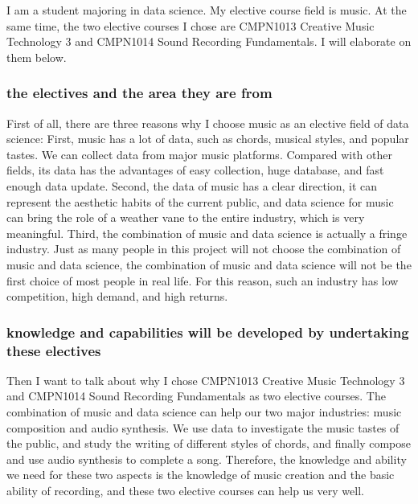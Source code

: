 \documentclass[../draft.tex]{subfiles}
\begin{document}
I am a student majoring in data science. My elective course field is music. At the same time, the two elective courses I chose are CMPN1013 Creative Music Technology 3 and CMPN1014 Sound Recording Fundamentals. I will elaborate on them below.
\subsubsection{the electives and the area they are from}
First of all, there are three reasons why I choose music as an elective field of data science: First, music has a lot of data, such as chords, musical styles, and popular tastes. We can collect data from major music platforms. Compared with other fields, its data has the advantages of easy collection, huge database, and fast enough data update. Second, the data of music has a clear direction, it can represent the aesthetic habits of the current public, and data science for music can bring the role of a weather vane to the entire industry, which is very meaningful. Third, the combination of music and data science is actually a fringe industry. Just as many people in this project will not choose the combination of music and data science, the combination of music and data science will not be the first choice of most people in real life. For this reason, such an industry has low competition, high demand, and high returns.
\subsubsection{knowledge and capabilities will be developed by undertaking these electives} 
Then I want to talk about why I chose CMPN1013 Creative Music Technology 3 and CMPN1014 Sound Recording Fundamentals as two elective courses. The combination of music and data science can help our two major industries: music composition and audio synthesis. We use data to investigate the music tastes of the public, and study the writing of different styles of chords, and finally compose and use audio synthesis to complete a song. Therefore, the knowledge and ability we need for these two aspects is the knowledge of music creation and the basic ability of recording, and these two elective courses can help us very well.
\end{document}
